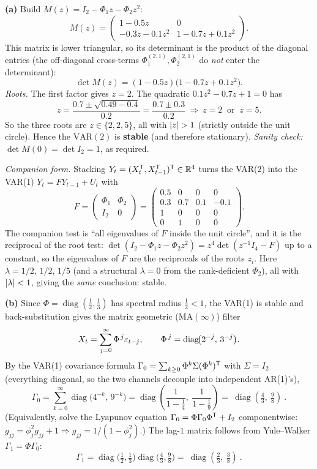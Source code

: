 \documentclass[11pt]{article}
\DeclareMathOperator{\diag}{diag}
\begin{document}
\textbf{(a)} Build $M(z)=I_2-\Phi_1 z-\Phi_2 z^2$:
\[
M(z)=\begin{pmatrix}
1-0.5z & 0\\[2pt]
-0.3z-0.1z^2 & 1-0.7z+0.1z^2
\end{pmatrix}.
\]
This matrix is lower triangular, so its determinant is the product of the diagonal entries (the off-diagonal cross-terms $\Phi_1^{(2,1)},\Phi_2^{(2,1)}$ do \emph{not} enter the determinant):
\[
\det M(z)=(1-0.5z)\bigl(1-0.7z+0.1z^2\bigr).
\]
\emph{Roots.} The first factor gives $z=2$. The quadratic $0.1z^2-0.7z+1=0$ has
\[
z=\frac{0.7\pm\sqrt{0.49-0.4}}{0.2}=\frac{0.7\pm0.3}{0.2}
\ \Longrightarrow\ z=2\ \text{ or }\ z=5 .
\]
So the three roots are $z\in\{2,2,5\}$, all with $\left\lvert z \right\rvert>1$ (strictly outside the unit circle). Hence the $\mathrm{VAR}(2)$ is \textbf{stable} (and therefore stationary). \emph{Sanity check:} $\det M(0)=\det I_2=1$, as required.

\emph{Companion form.} Stacking $Y_t=(X_t^{\mathsf{T}},X_{t-1}^{\mathsf{T}})^{\mathsf{T}}\in\mathbb{R}^4$ turns the VAR(2) into the VAR(1) $Y_t=FY_{t-1}+U_t$ with
\[
F=\begin{pmatrix}\Phi_1 & \Phi_2\\ I_2 & 0\end{pmatrix}
=\begin{pmatrix}
0.5 & 0 & 0 & 0\\
0.3 & 0.7 & 0.1 & -0.1\\
1 & 0 & 0 & 0\\
0 & 1 & 0 & 0
\end{pmatrix}.
\]
The companion test is ``all eigenvalues of $F$ inside the unit circle'', and it is the reciprocal of the root test: $\det(I_2-\Phi_1 z-\Phi_2 z^2)=z^{4}\det(z^{-1}I_4-F)$ up to a constant, so the eigenvalues of $F$ are the reciprocals of the roots $z_i$. Here $\lambda=1/2,\,1/2,\,1/5$ (and a structural $\lambda=0$ from the rank-deficient $\Phi_2$), all with $\left\lvert \lambda \right\rvert<1$, giving the \emph{same} conclusion: stable.

\textbf{(b)} Since $\Phi=\diag(\tfrac12,\tfrac13)$ has spectral radius $\tfrac12<1$, the VAR(1) is stable and back-substitution gives the matrix geometric ($\mathrm{MA}(\infty)$) filter
\[
X_t=\sum_{j=0}^{\infty}\Phi^{\,j}\eps_{t-j},
\qquad
\Phi^{\,j}=\diag\!\bigl(2^{-j},\,3^{-j}\bigr).
\]
By the VAR(1) covariance formula $\Gamma_0=\sum_{k\ge0}\Phi^k\Sigma(\Phi^k)^{\mathsf{T}}$ with $\Sigma=I_2$ (everything diagonal, so the two channels decouple into independent AR(1)'s),
\[
\Gamma_0=\sum_{k=0}^{\infty}\diag\!\bigl(4^{-k},\,9^{-k}\bigr)
=\diag\!\left(\frac{1}{1-\tfrac14},\ \frac{1}{1-\tfrac19}\right)
=\boxed{\ \diag\!\left(\tfrac43,\ \tfrac98\right)\ }.
\]
(Equivalently, solve the Lyapunov equation $\Gamma_0=\Phi\Gamma_0\Phi^{\mathsf{T}}+I_2$ componentwise: $g_{jj}=\phi_j^2 g_{jj}+1\Rightarrow g_{jj}=1/(1-\phi_j^2)$.) The lag-$1$ matrix follows from Yule--Walker $\Gamma_1=\Phi\Gamma_0$:
\[
\Gamma_1=\diag\!\bigl(\tfrac12,\tfrac13\bigr)\diag\!\bigl(\tfrac43,\tfrac98\bigr)
=\boxed{\ \diag\!\left(\tfrac23,\ \tfrac38\right)\ }.
\]
\end{document}
